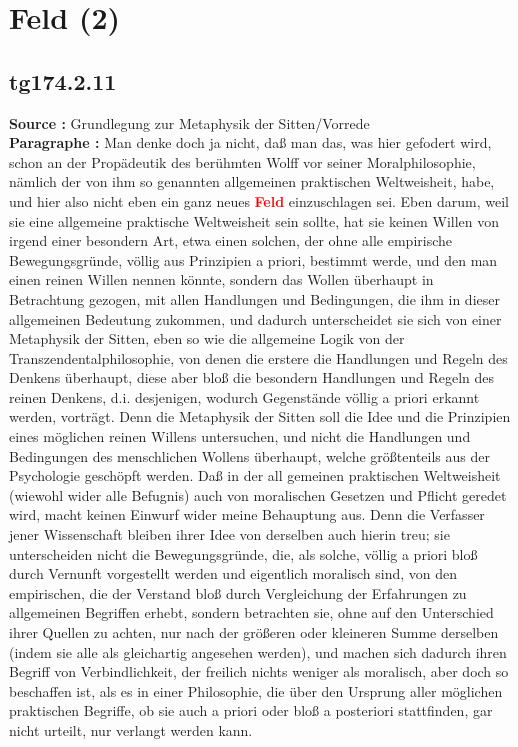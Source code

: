 \documentclass[a4paper,12pt,twoside]{book}
\newcommand{\match}[1]{\textcolor{red}{\textbf{#1}}}
\newcommand{\unnumberedsection}[1]{
	\section*{#1}
	\addcontentsline{toc}{section}{#1}
	\markright{#1}
}
\begin{document}
	\unnumberedsection{Feld (2)} 
	\subsection*{tg174.2.11} 
	\textbf{Source : }Grundlegung zur Metaphysik der Sitten/Vorrede\\  
	
	\noindent\textbf{Paragraphe : }Man denke doch ja nicht, daß man das, was hier gefodert wird, schon an der Propädeutik des berühmten Wolff vor seiner Moralphilosophie, nämlich der von ihm so genannten allgemeinen praktischen Weltweisheit, habe, und hier also nicht eben ein ganz neues \match{Feld} einzuschlagen sei.  Eben darum, weil sie eine allgemeine praktische Weltweisheit sein sollte, hat sie keinen Willen von irgend einer besondern Art, etwa einen solchen, der ohne alle empirische Bewegungsgründe, völlig aus Prinzipien a priori, bestimmt werde, und den man einen reinen Willen nennen könnte, sondern das Wollen überhaupt in Betrachtung gezogen, mit allen Handlungen und Bedingungen, die ihm in dieser allgemeinen Bedeutung zukommen, und dadurch unterscheidet sie sich von einer Metaphysik der Sitten, eben so wie die allgemeine Logik von der Transzendentalphilosophie, von denen die erstere die Handlungen und Regeln des Denkens überhaupt, diese aber bloß die besondern Handlungen und Regeln des reinen Denkens, d.i. desjenigen, wodurch Gegenstände völlig a priori erkannt werden, vorträgt. Denn die Metaphysik der Sitten soll die Idee und die Prinzipien eines möglichen reinen Willens untersuchen, und nicht die Handlungen und Bedingungen des menschlichen Wollens überhaupt, welche größtenteils aus der Psychologie geschöpft werden. Daß in der all gemeinen praktischen Weltweisheit (wiewohl wider alle Befugnis) auch von moralischen Gesetzen und Pflicht geredet wird, macht keinen Einwurf wider meine Behauptung aus. Denn die Verfasser jener Wissenschaft bleiben ihrer Idee von derselben auch hierin treu; sie unterscheiden nicht die Bewegungsgründe, die, als solche, völlig a priori bloß durch Vernunft vorgestellt werden und eigentlich moralisch sind, von den empirischen, die der Verstand bloß durch Vergleichung der Erfahrungen zu allgemeinen Begriffen erhebt, sondern betrachten sie, ohne auf den Unterschied ihrer Quellen zu achten, nur nach der größeren oder kleineren Summe derselben (indem sie alle als gleichartig angesehen werden), und machen sich dadurch ihren Begriff von Verbindlichkeit, der freilich nichts weniger als moralisch, aber doch so beschaffen ist, als es in einer Philosophie, die über den Ursprung aller möglichen praktischen Begriffe, ob sie auch a priori oder bloß a posteriori stattfinden, gar nicht urteilt, nur verlangt werden kann. 
	
\end{document}
